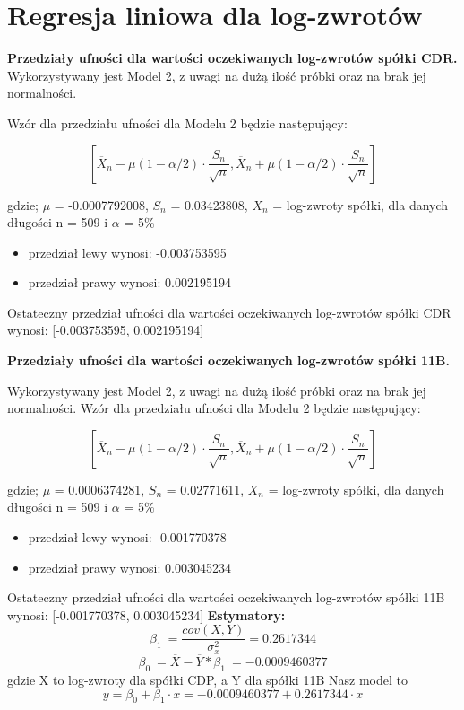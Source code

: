 \documentclass[a4paper,11pt]{article}
\def\\{\hfill\break}
\begin{document}
\section{Regresja liniowa dla log-zwrotów}


\textbf{Przedziały ufności dla wartości oczekiwanych log-zwrotów spółki CDR.}
\\
\\
Wykorzystywany jest Model 2, z uwagi na dużą ilość próbki oraz na brak jej normalności.

Wzór dla przedziału ufności dla Modelu 2 będzie następujący:

$$[\overline{X}_n - \mu(1-\alpha/2)\cdot\frac{S_n}{\sqrt{n}}, \overline{X}_n + \mu(1-\alpha/2)\cdot\frac{S_n}{\sqrt{n}}]$$

gdzie; $\mu$ = -0.0007792008, $S_n$ = 0.03423808, $X_n$ = log-zwroty spółki, dla danych długości n = 509 i $\alpha$ =  5\%
\begin{itemize}
 \item przedział lewy wynosi: -0.003753595
\item przedział prawy wynosi: 0.002195194
\end{itemize} 
Ostateczny przedział ufności dla wartości oczekiwanych log-zwrotów spółki CDR wynosi:
[-0.003753595, 0.002195194]

\newpage
\\
\textbf{Przedziały ufności dla wartości oczekiwanych log-zwrotów spółki 11B.}

\\
\\
Wykorzystywany jest Model 2, z uwagi na dużą ilość próbki oraz na brak jej normalności.
\\
Wzór dla przedziału ufności dla Modelu 2 będzie następujący:

$$[\overline{X}_n - \mu(1-\alpha/2)\cdot\frac{S_n}{\sqrt{n}}, \overline{X}_n + \mu(1-\alpha/2)\cdot\frac{S_n}{\sqrt{n}}]$$

gdzie; $\mu$ = 0.0006374281, $S_n$ = 0.02771611, $X_n$ = log-zwroty spółki, dla danych długości n = 509 i $\alpha$ =  5\%
\begin{itemize}
 \item przedział lewy wynosi: -0.001770378
\item przedział prawy wynosi: 0.003045234
\end{itemize} 
Ostateczny przedział ufności dla wartości oczekiwanych log-zwrotów spółki 11B wynosi:
[-0.001770378, 0.003045234]
\\
\\
\textbf{Estymatory:}
$$\beta_1\ = \frac{cov(X,Y)}{\sigma_x^2} = 0.2617344 $$ 
$$\beta_0\ = \overline{X} -\overline{Y} * \beta_1\ =  -0.0009460377 $$ 
gdzie X to log-zwroty dla spółki CDP, a Y dla spółki 11B
\\
Nasz model to $$ y = \beta_0 + \beta_1 \cdot x = -0.0009460377 + 0.2617344 \cdot x $$
\end{document}
